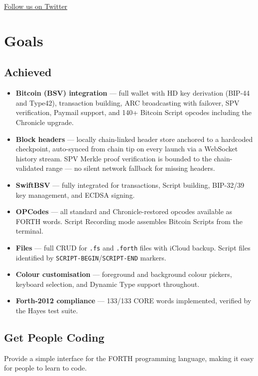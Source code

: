 \documentclass[a4paper, 11pt, openany]{book}
\begin{document}
\href{https://x.com/forth_hence4h}{Follow us on Twitter}

\chapter{Goals}

\section{Achieved}

\begin{itemize}
\item \textbf{Bitcoin (BSV) integration} --- full wallet with HD key derivation (BIP-44 and Type42), transaction building, ARC broadcasting with failover, SPV verification, Paymail support, and 140+ Bitcoin Script opcodes including the Chronicle upgrade.
\item \textbf{Block headers} --- locally chain-linked header store anchored to a hardcoded checkpoint, auto-synced from chain tip on every launch via a WebSocket history stream. SPV Merkle proof verification is bounded to the chain-validated range --- no silent network fallback for missing headers.
\item \textbf{SwiftBSV} --- fully integrated for transactions, Script building, BIP-32/39 key management, and ECDSA signing.
\item \textbf{OPCodes} --- all standard and Chronicle-restored opcodes available as FORTH words. Script Recording mode assembles Bitcoin Scripts from the terminal.
\item \textbf{Files} --- full CRUD for \texttt{.fs} and \texttt{.forth} files with iCloud backup. Script files identified by \texttt{SCRIPT-BEGIN}/\texttt{SCRIPT-END} markers.
\item \textbf{Colour customisation} --- foreground and background colour pickers, keyboard selection, and Dynamic Type support throughout.
\item \textbf{Forth-2012 compliance} --- 133/133 CORE words implemented, verified by the Hayes test suite.
\end{itemize}

\section{Get People Coding}

Provide a simple interface for the FORTH programming language, making it easy for people to learn to code.
\end{document}
